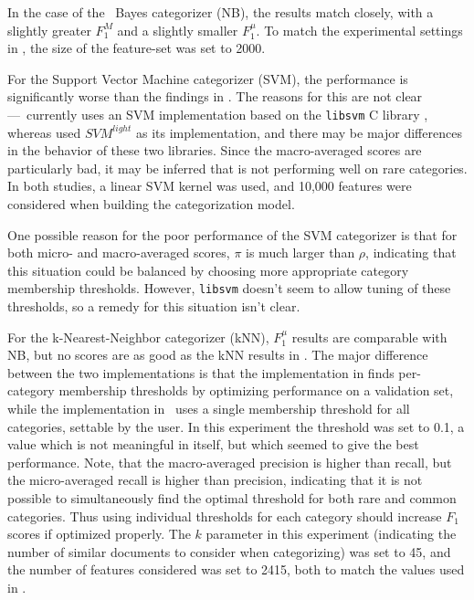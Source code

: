 In the case of the \naive\ Bayes categorizer (NB), the results match
\cite{yang:99} closely, with a slightly greater $F_1^M$ and a slightly
smaller $F_1^\mu$.  To match the experimental
settings in \cite{yang:99}, the size of the feature-set was set to
2000.

For the Support Vector Machine categorizer (SVM), the performance is
significantly worse than the findings in \cite{yang:99}.  The reasons
for this are not clear---\aicat\ currently uses an SVM implementation
based on the \texttt{libsvm} C library \cite{libsvm}, whereas
\cite{yang:99} used $SVM^{light}$ as its
implementation\cite{joachims:99a}, and there may be major differences
in the behavior of these two libraries.  Since the macro-averaged scores are
particularly bad, it may be inferred that \cite{libsvm} is not
performing well on rare categories.  In both studies, a linear SVM
kernel was used, and 10,000 features were considered when building the
categorization model.

One possible reason for the poor performance of the SVM categorizer is
that for both micro- and macro-averaged scores, $\pi$ is much larger
than $\rho$, indicating that this situation could be balanced by
choosing more appropriate category membership thresholds.  However,
\texttt{libsvm} doesn't seem to allow tuning of these thresholds, so a
remedy for this situation isn't clear.

For the k-Nearest-Neighbor categorizer (kNN), $F_1^\mu$ results are comparable
with NB, but no scores are as good as the kNN results in \cite{yang:99}.
The major difference between the two implementations is that the
implementation in \cite{yang:99} finds per-category membership
thresholds by optimizing performance on a validation set, while the
implementation in \aicat\ uses a single membership threshold for all
categories, settable by the user.  In this experiment the threshold
was set to 0.1, a value which is not meaningful in itself, but which
seemed to give the best performance.  Note, that the macro-averaged
precision is higher than recall, but the micro-averaged recall is
higher than precision, indicating that it is not possible to
simultaneously find the optimal threshold for both rare and common
categories.  Thus using individual thresholds for each category should
increase $F_1$ scores if optimized properly.  The $k$ parameter
in this experiment
(indicating the number of similar documents to consider when
categorizing) was set to 45, and the number of features considered was
set to 2415, both to match the values used in \cite{yang:99}.

